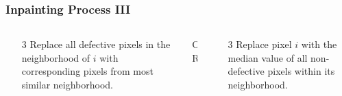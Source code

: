 \documentclass{beamer}
\begin{document}
\begin{frame}
\frametitle{Inpainting Process III}
\begin{columns}
\begin{column}{0.45\textwidth}
\begin{enumerate}
\item[3] Replace all defective pixels in the neighborhood of $i$ with corresponding pixels from most similar neighborhood.
\end{enumerate}

\end{column}
\begin{column}{0.1\textwidth}
OR
\end{column}
\begin{column}{0.45\textwidth}
\begin{enumerate}
\item[3] Replace pixel $i$ with the median value of all non-defective pixels within its neighborhood.
\end{enumerate}


\end{column}
\end{columns}
\end{frame}
\end{document}

